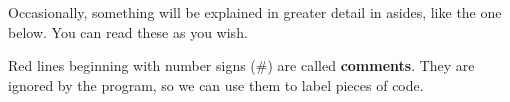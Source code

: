 Occasionally, something will be explained in greater detail in asides, like the one below. You can read these as you wish.
	
\begin{aside}
	Red lines beginning with number signs (\#) are called \textbf{comments}.
	They are ignored by the program, so we can use them to label pieces of code.
\end{aside}